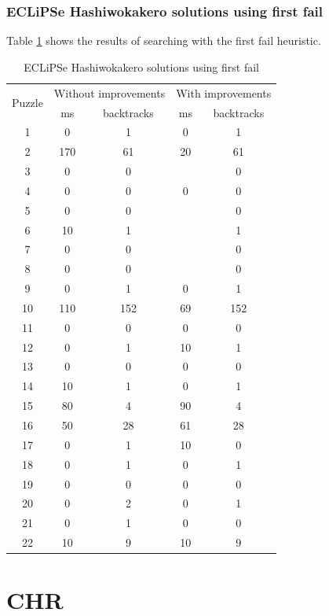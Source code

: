 \documentclass{report}
\begin{document}
\subsubsection{ECLiPSe Hashiwokakero solutions using first fail}
Table \ref{table:hashi-2} shows the results of searching with the first fail heuristic.
\begin{table}[h!]
  \begin{tabular}{|c|c|c|c|c|}
    \hline
    \multirow{2}{*}{Puzzle} &
    \multicolumn{2}{L|}{Without improvements} &
    \multicolumn{2}{L|}{With improvements}\\
    & ms & backtracks & ms & backtracks \\
    \hline
        1 & 0 & 1 & 0 & 1 \\
        2 & 170 & 61 & 20 & 61 \\
        3 & 0 & 0 &  & 0 \\
        4 & 0 & 0 & 0 & 0 \\
        5 & 0 & 0 &  & 0 \\
        6 & 10 & 1 &  & 1 \\
        7 & 0 & 0 &  & 0 \\
        8 & 0 & 0 &  & 0 \\
        9 & 0 & 1 & 0 & 1 \\
        10 & 110 & 152 & 69 & 152 \\
        11 & 0 & 0 & 0 & 0 \\
        12 & 0 & 1 & 10 & 1 \\
        13 & 0 & 0 & 0 & 0 \\
        14 & 10 & 1 & 0 & 1 \\
        15 & 80 & 4 & 90 & 4 \\
        16 & 50 & 28 & 61 & 28 \\
        17 & 0 & 1 & 10 & 0 \\
        18 & 0 & 1 & 0 & 1 \\
        19 & 0 & 0 & 0 & 0 \\
        20 & 0 & 2 & 0 & 1 \\
        21 & 0 & 1 & 0 & 0 \\
        22 & 10 & 9 & 10 & 9 \\
    \hline
  \end{tabular}
  \caption{ECLiPSe Hashiwokakero solutions using first fail}
  \label{table:hashi-2}
\end{table}

\newpage
\newpage
\section{CHR}
\end{document}

